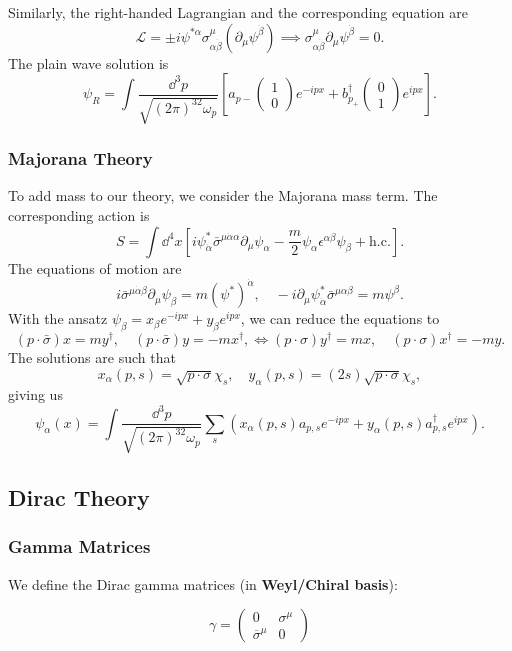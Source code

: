 \documentclass{article}
\begin{document}
Similarly, the right-handed Lagrangian and the corresponding equation are
$$\mathcal L=\pm i\psi^{*\alpha}\sigma^\mu_{\alpha\dot\beta}(\partial_\mu\psi^{\dot\beta})\implies\sigma^\mu_{\alpha\dot\beta}\partial_\mu\psi^{\dot\beta}=0.$$
The plain wave solution is
$$\psi_R=\int\frac{\dd^3p}{\sqrt{(2\pi)^32\omega_p}}\left[a_{p-}\begin{pmatrix}1\\0\end{pmatrix}e^{-ipx}+b^\dag_{p_+}\begin{pmatrix}0\\1\end{pmatrix}e^{ipx}\right].$$


\subsubsection{Majorana Theory}
To add mass to our theory, we consider the Majorana mass term. The corresponding action is 
$$S=\int\dd^4x\left[i\psi^*_{\dot\alpha}\bar\sigma^{\mu\dot\alpha\alpha}\partial_\mu\psi_\alpha-\frac m2\psi_\alpha\epsilon^{\alpha\beta}\psi_\beta+\text{h.c.}\right].$$
The equations of motion are
$$i\bar\sigma^{\mu\dot\alpha\beta}\partial_\mu\psi_\beta=m(\psi^*)^{\dot\alpha},\quad -i\partial_\mu\psi^*_{\dot\alpha}\bar\sigma^{\mu\alpha\beta}=m\psi^\beta.$$
With the ansatz $\psi_\beta=x_\beta e^{-ipx}+y_\beta e^{ipx}$, we can reduce the equations to 
$$(p\cdot\bar\sigma)x=my^\dag,\quad (p\cdot\bar\sigma)y=-mx^\dag,\iff(p\cdot\sigma)y^\dag=mx,\quad(p\cdot\sigma)x^\dag=-my.$$
The solutions are such that 
$$x_\alpha(p,s)=\sqrt{p\cdot\sigma}\chi_s,\quad y_\alpha(p,s)=(2s)\sqrt{p\cdot\sigma}\chi_s,$$
giving us 
$$\psi_\alpha(x)=\int\frac{\dd^3p}{\sqrt{(2\pi)^32\omega_p}}\sum_s\left(x_\alpha(p,s)a_{p,s}e^{-ipx}+y_\alpha(p,s)a^\dag_{p,s}e^{ipx}\right).$$

\subsection{Dirac Theory}

\subsubsection{Gamma Matrices}

We define the Dirac gamma matrices (in \textbf{Weyl/Chiral basis}):

$$\gamma=\begin{pmatrix}0&\sigma^\mu\\\overline\sigma^\mu&0\end{pmatrix}$$
\end{document}

